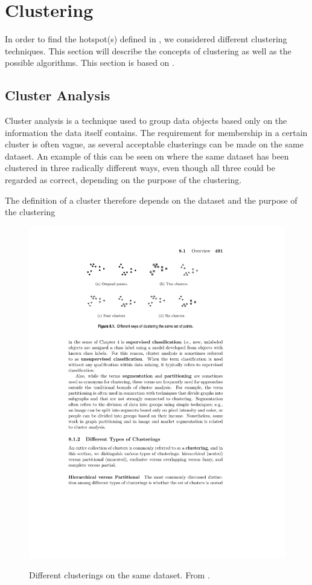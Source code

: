 \section{Clustering}\label{clustering}
In order to find the hotspot(s) defined in , we considered different clustering techniques.
This section will describe the concepts of clustering as well as the possible algorithms.
This section is based on \citet{pang2006introduction}.

\subsection{Cluster Analysis}
Cluster analysis is a technique used to group data objects based only on the information the data itself contains.
The requirement for membership in a certain cluster is often vague, as several acceptable clusterings can be made on the same dataset.
An example of this can be seen on  where the same dataset has been clustered in three radically different ways, even though all three could be regarded as correct, depending on the purpose of the clustering.

The definition of a cluster therefore depends on the dataset and the purpose of the clustering 

\begin{figure}[H]
\includegraphics[trim= 3.1cm 20.61cm 5cm 2.5cm, clip=true]{graphics/different_clusters}
\centering
\label{clusterings}
\caption{Different clusterings on the same dataset. From \citet{pang2006introduction}.}
\end{figure}

